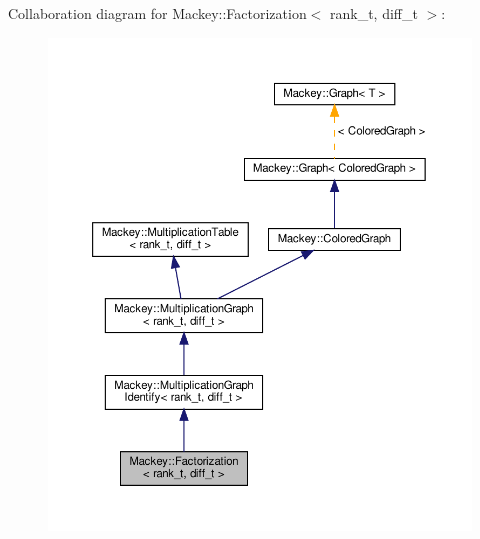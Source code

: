 Collaboration diagram for Mackey\+:\+:Factorization$<$ rank\+\_\+t, diff\+\_\+t $>$\+:\nopagebreak
\begin{figure}[H]
\begin{center}
\leavevmode
\includegraphics[width=350pt]{classMackey_1_1Factorization__coll__graph}
\end{center}
\end{figure}
